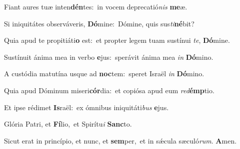 Fiant aures tuæ inten\textbf{dén}tes:~\redgreheightstar in vocem deprecatió\textit{nis} \textbf{me}æ.

Si iniquitátes observáveris, \textbf{Dó}mine:~\redgreheightstar Dómine, quis sus\textit{ti}\textbf{né}bit?

Quia apud te propitiáti\textbf{o} est:~\redgreheightstar et propter legem tuam sustínui \textit{te}, \textbf{Dó}mine.

Sustínuit ánima mea in verbo \textbf{e}jus:~\redgreheightstar sperávit ánima mea \textit{in} \textbf{Dó}mino.

A custódia matutína usque ad \textbf{noc}tem:~\redgreheightstar speret Israël \textit{in} \textbf{Dó}mino.

Quia apud Dóminum miseri\textbf{cór}dia:~\redgreheightstar et copiósa apud eum \textit{red}\textbf{émp}tio.

Et ipse rédimet \textbf{Is}raël:~\redgreheightstar ex ómnibus iniquitáti\textit{bus} \textbf{e}jus.

Glória Patri, et \textbf{Fí}lio,~\redgreheightstar et Spirítu\textit{i} \textbf{Sanc}to.

Sicut erat in princípio, et nunc, et \textbf{sem}per,~\redgreheightstar et in sǽcula sæculó\textit{rum}. \textbf{A}men.


